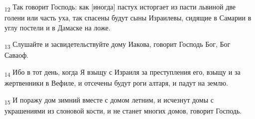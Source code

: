 \begin{tcolorbox}
\textsubscript{12} Так говорит Господь: как [иногда] пастух исторгает из пасти львиной две голени или часть уха, так спасены будут сыны Израилевы, сидящие в Самарии в углу постели и в Дамаске на ложе.
\end{tcolorbox}
\begin{tcolorbox}
\textsubscript{13} Слушайте и засвидетельствуйте дому Иакова, говорит Господь Бог, Бог Саваоф.
\end{tcolorbox}
\begin{tcolorbox}
\textsubscript{14} Ибо в тот день, когда Я взыщу с Израиля за преступления его, взыщу и за жертвенники в Вефиле, и отсечены будут роги алтаря, и падут на землю.
\end{tcolorbox}
\begin{tcolorbox}
\textsubscript{15} И поражу дом зимний вместе с домом летним, и исчезнут домы с украшениями из слоновой кости, и не станет многих домов, говорит Господь.
\end{tcolorbox}

